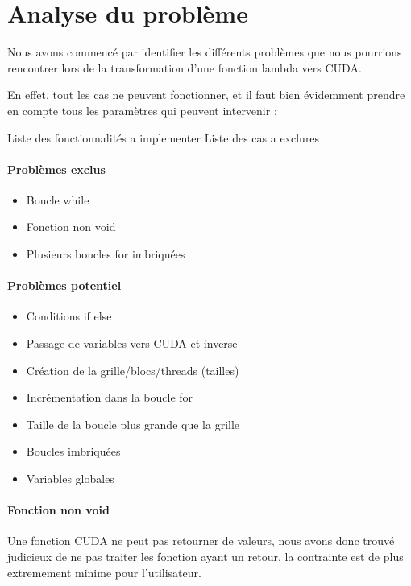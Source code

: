 \documentclass{article}
\begin{document}
	
	\section{Analyse du problème}
	
	Nous avons commencé par identifier les différents problèmes que nous pourrions rencontrer lors de la transformation d'une fonction lambda vers CUDA.
	
	
	En effet, tout les cas ne peuvent fonctionner, et il faut bien évidemment prendre en compte tous les paramètres qui peuvent intervenir :

	Liste des fonctionnalités a implementer
	Liste des cas a exclures
	\paragraph{Problèmes exclus}
	\begin{itemize}
  		\item Boucle while
  		\item Fonction non void
  		\item Plusieurs boucles for imbriquées	
	\end{itemize}
	
	\paragraph{Problèmes potentiel}
		\begin{itemize}
  		\item Conditions if else
  		\item Passage de variables vers CUDA et inverse
  		\item Création de la grille/blocs/threads (tailles)
  		\item Incrémentation dans la boucle for
  		\item Taille de la boucle plus grande que la grille
  		\item Boucles imbriquées
  		\item Variables globales
	\end{itemize}
	\paragraph{Fonction non void}
	Une fonction CUDA ne peut pas retourner de valeurs, nous avons donc trouvé judicieux de ne pas traiter les fonction ayant un retour, la contrainte est de plus extremement minime pour l'utilisateur.
	
	\newpage	
	
\end{document}
